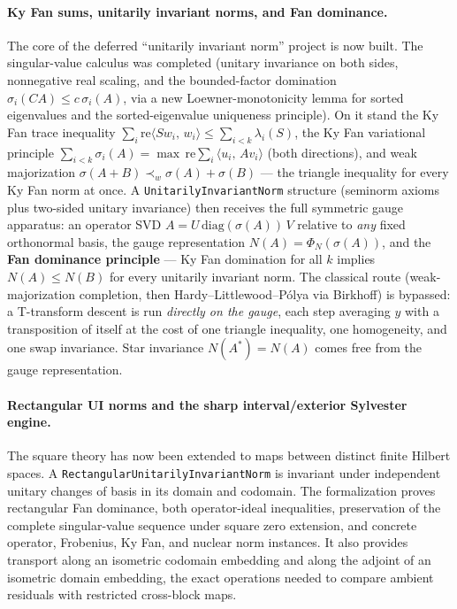 \documentclass[11pt]{article}
\newcommand{\inner}[2]{\langle #1,\,#2\rangle}
\theoremstyle{remark}
\begin{document}
\paragraph{Ky Fan sums, unitarily invariant norms, and Fan dominance.}
The core of the deferred ``unitarily invariant norm'' project is now built.
The singular-value calculus was completed (unitary invariance on both sides,
nonnegative real scaling, and the bounded-factor domination
$\sigma_i(CA)\le c\,\sigma_i(A)$, via a new Loewner-monotonicity lemma for
sorted eigenvalues and the sorted-eigenvalue uniqueness principle).  On it
stand the Ky Fan trace inequality
$\sum_i\mathrm{re}\inner{Sw_i}{w_i}\le\sum_{i<k}\lambda_i(S)$, the Ky Fan
variational principle
$\sum_{i<k}\sigma_i(A)=\max\,\mathrm{re}\sum_i\inner{u_i}{Av_i}$ (both
directions), and weak majorization
$\sigma(A+B)\prec_w\sigma(A)+\sigma(B)$ --- the triangle inequality for every
Ky Fan norm at once.  A \texttt{UnitarilyInvariantNorm} structure (seminorm
axioms plus two-sided unitary invariance) then receives the full symmetric
gauge apparatus: an operator SVD $A=U\,\mathrm{diag}(\sigma(A))\,V$ relative
to \emph{any} fixed orthonormal basis, the gauge representation
$N(A)=\Phi_N(\sigma(A))$, and the \textbf{Fan dominance principle} --- Ky Fan
domination for all $k$ implies $N(A)\le N(B)$ for every unitarily invariant
norm.  The classical route (weak-majorization completion, then
Hardy--Littlewood--P\'olya via Birkhoff) is bypassed: a T-transform descent is
run \emph{directly on the gauge}, each step averaging $y$ with a transposition
of itself at the cost of one triangle inequality, one homogeneity, and one
swap invariance.  Star invariance $N(A^{*})=N(A)$ comes free from the gauge
representation.

\paragraph{Rectangular UI norms and the sharp interval/exterior Sylvester engine.}
The square theory has now been extended to maps between distinct finite
Hilbert spaces.  A \texttt{RectangularUnitarilyInvariantNorm} is invariant
under independent unitary changes of basis in its domain and codomain.  The
formalization proves rectangular Fan dominance, both operator-ideal
inequalities, preservation of the complete singular-value sequence under
square zero extension, and concrete operator, Frobenius, Ky Fan, and nuclear
norm instances.  It also provides transport along an isometric codomain
embedding and along the adjoint of an isometric domain embedding, the exact
operations needed to compare ambient residuals with restricted cross-block
maps.
\end{document}
